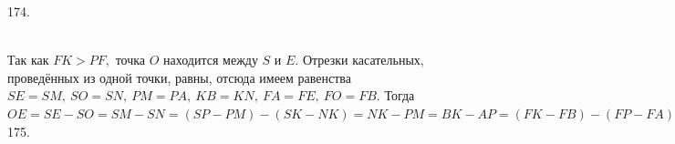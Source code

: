 \documentclass[12pt]{article}
\begin{document}
174. \begin{figure}[ht!]
\end{figure}\\
Так как $FK>PF,$ точка $O$ находится между $S$ и $E.$ Отрезки касательных, проведённых из одной точки, равны, отсюда имеем равенства $SE = SM,\ SO = SN,\ PM =
PA,\ KB = KN,\  FA = FE,\  FO = FB.$ Тогда $OE = SE - SO = SM - SN = (SP - PM) - (SK - NK) = NK - PM =
BK - AP = (FK - FB) - (FP - FA) = FA - FB + 2 = FE - FO + 2 =
2 - OE \Rightarrow 2OE = 2\Rightarrow OE=1.$\\
175. \begin{figure}[ht!]
\end{figure}\\
\end{document}
